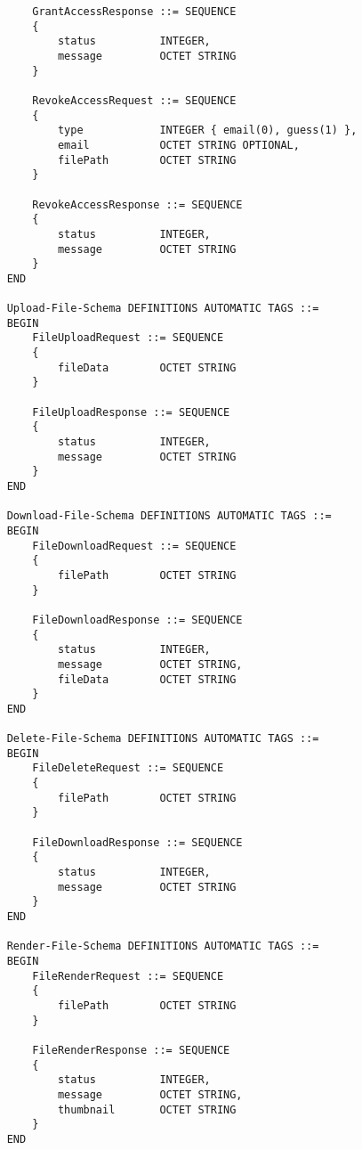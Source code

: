 \documentclass{article}
\begin{document}
\begin{verbatim}
        GrantAccessResponse ::= SEQUENCE
        {
            status          INTEGER,
            message         OCTET STRING
        }
        
        RevokeAccessRequest ::= SEQUENCE
        {
            type            INTEGER { email(0), guess(1) },
            email           OCTET STRING OPTIONAL,
            filePath        OCTET STRING
        }
        
        RevokeAccessResponse ::= SEQUENCE
        {
            status          INTEGER,
            message         OCTET STRING
        }
    END
    
    Upload-File-Schema DEFINITIONS AUTOMATIC TAGS ::= 
    BEGIN
        FileUploadRequest ::= SEQUENCE
        {
            fileData        OCTET STRING
        }
        
        FileUploadResponse ::= SEQUENCE
        {
            status          INTEGER,
            message         OCTET STRING
        }
    END
    
    Download-File-Schema DEFINITIONS AUTOMATIC TAGS ::= 
    BEGIN
        FileDownloadRequest ::= SEQUENCE
        {
            filePath        OCTET STRING
        }
        
        FileDownloadResponse ::= SEQUENCE
        {
            status          INTEGER,
            message         OCTET STRING,
            fileData        OCTET STRING
        }
    END
    
    Delete-File-Schema DEFINITIONS AUTOMATIC TAGS ::= 
    BEGIN
        FileDeleteRequest ::= SEQUENCE
        {
            filePath        OCTET STRING
        }
        
        FileDownloadResponse ::= SEQUENCE
        {
            status          INTEGER,
            message         OCTET STRING
        }
    END
    
    Render-File-Schema DEFINITIONS AUTOMATIC TAGS ::= 
    BEGIN
        FileRenderRequest ::= SEQUENCE
        {
            filePath        OCTET STRING
        }
        
        FileRenderResponse ::= SEQUENCE
        {
            status          INTEGER,
            message         OCTET STRING,
            thumbnail       OCTET STRING
        }
    END
\end{verbatim}
\end{document}
